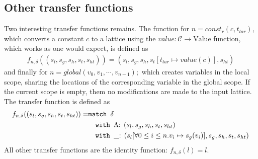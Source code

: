\subsection{Other transfer functions}
Two interesting transfer functions remains. The function for $n = \mathit{const}_r(c, t_{tar})$, which converts a constant $c$ to a lattice using the $value : \mathcal{C} \rightarrow \text{Value}$ function, which works as one would expect, is defined as
\begin{align}
f_{n,\delta}((s_l, s_g, s_h, s_t,s_{ht})) = (s_l, s_g, s_h, s_t[t_{tar} \mapsto value(c)], s_{ht})
\end{align}
and finally for $n = global(v_0, v_1, \cdots, v_{n-1});$ which creates variables in the local scope, sharing the locations of the corresponding variable in the global scope. If the current scope is empty, them no modifications are made to the input lattice. The transfer function is defined as
\begin{align}
f_{n, \delta} ((s_l,s_g,s_h,s_t, s_{ht})) =     &\texttt{match }\delta\notag\\
                                                &\quad\texttt{with }\Lambda\text{: }(s_l,s_g,s_h,s_t, s_{ht})\notag\\
                                                &\quad\texttt{with }\_\text{: }(s_l[\forall 0\leq i \leq n. v_i\mapsto s_g(v_i)],s_g,s_h,s_t, s_{ht})
\end{align}
All other transfer functions are the identity function: $f_{n,\delta}(l) = l$.
